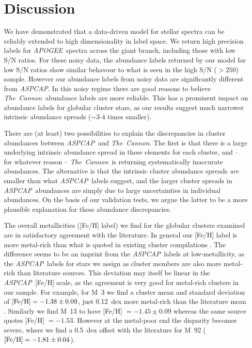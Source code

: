 \documentclass[12pt,preprint]{aastex6}
\newcommand{\project}[1]{\textsl{#1}}
\newcommand{\TheCannon}{\project{The~Cannon}}
\newcommand{\acronym}[1]{{\small{#1}}}
\newcommand{\apogee}{\project{\acronym{APOGEE}}}
\newcommand{\aspcap}{\project{\acronym{ASPCAP}}}
\begin{document}
\section{Discussion}
\label{sec:discussion}


We have demonstrated that a data-driven model for stellar spectra can be
reliably extended to high dimensionality in label space. We return high
precision labels for \apogee\ spectra across the giant branch, including
those with low S/N ratios. For these noisy data, the abundance labels returned
by our model for low S/N ratios show similar behavour to what is seen in the high
S/N ($>250$) sample.  However our abundance labels from noisy data are
significantly different from \aspcap. In this noisy regime
there are good reasons to believe \TheCannon\ abundance labels are more
reliable.  This has a prominent impact on abundance labels for globular
cluster stars, as our results suggest much narrower intrinsic abundance
spreads ($\sim$3-4 times smaller).


There are (at least) two possibilities to explain the discrepancies in
cluster abundances between \aspcap\ and \TheCannon.  The first is that
there is a large underlying intrinsic abundance spread in these elements
for each cluster, and -- for whatever reason -- \TheCannon\ is returning
systematically inaccurate abundances.  The alternative is that the
intrinsic cluster abundance spreads \emph{are} smaller than what \aspcap\
labels suggest, and the larger cluster spreads in \aspcap\ abundances are
simply due to large uncertainties in individual abundances.  On the basis
of our validation tests, we argue the latter to be a more plausible
explanation for these abundance discrepancies.


The overall metallicities ([Fe/H] label) we find for the globular
clusters examined are in satisfactory agreement with the literature.  In
general our [Fe/H] label is more metal-rich than what is quoted in existing cluster
compilations \citep{Harris_1996}.  The difference seems to be an imprint from
the \aspcap\ labels at low-metallicity, as the \aspcap\ labels for 
stars we assign as cluster members are also more metal-rich than
literature sources. This deviation may itself be linear in the 
\aspcap\ [Fe/H] scale, as the agreement is very good for 
metal-rich clusters in our sample.  For example, for M~3 we find a cluster mean and standard
deviation of $[{\rm Fe/H}] = -1.38 \pm 0.09$, just 0.12~dex more metal-rich
than the literature mean \citep{Harris_1996}.  Similarly we find M~13 to have
[Fe/H] $= -1.45 \pm 0.09$ whereas the same source quotes [Fe/H] $= -1.53$.
However at the metal-poor end the disparity becomes severe, where we find
a 0.5~dex offset with the literature for M~92 ($[{\rm Fe/H}] = -1.81 \pm 0.04$).
\end{document}
